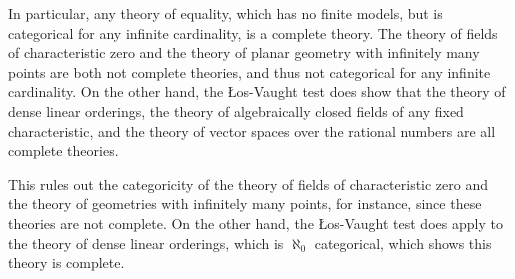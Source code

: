 In particular, any theory of equality, which has no finite models, but is categorical for any infinite cardinality, is a complete theory. The theory of fields of characteristic zero and the theory of planar geometry with infinitely many points are both not complete theories, and thus not categorical for any infinite cardinality. On the other hand, the Łos-Vaught test does show that the theory of dense linear orderings, the theory of algebraically closed fields of any fixed characteristic, and the theory of vector spaces over the rational numbers are all complete theories.

This rules out the categoricity of the theory of fields of characteristic zero and the theory of geometries with infinitely many points, for instance, since these theories are not complete. On the other hand, the Łos-Vaught test does apply to the theory of dense linear orderings, which is $\aleph_0$ categorical, which shows this theory is complete.

